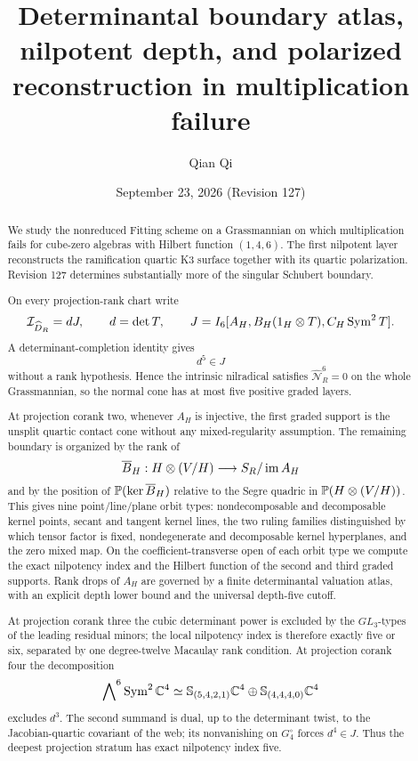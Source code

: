 \title[Determinantal boundary atlas]{Determinantal boundary atlas, nilpotent depth, and polarized reconstruction in multiplication failure}
\author{Qian Qi}
\date{September 23, 2026 \quad (Revision 127)}
\begin{abstract}
We study the nonreduced Fitting scheme on a Grassmannian on which
multiplication fails for cube-zero algebras with Hilbert function
\((1,4,6)\).  The first nilpotent layer reconstructs the ramification
quartic K3 surface together with its quartic polarization.  Revision
127 determines substantially more of the singular Schubert boundary.

On every projection-rank chart write
\[
 \mathcal I_{\widehat D_R}=dJ,\qquad
 d=\det T,\qquad
 J=I_6[A_H,B_H(1_H\otimes T),C_H\operatorname{Sym}^2T].
\]
A determinant-completion identity gives
\[
 d^5\in J
\]
without a rank hypothesis.  Hence the intrinsic nilradical satisfies
\(\widehat{\mathcal N}_R^6=0\) on the whole Grassmannian, so the
normal cone has at most five positive graded layers.

At projection corank two, whenever \(A_H\) is injective, the first
graded support is the unsplit quartic contact cone without any
mixed-regularity assumption.  The remaining boundary is organized by
the rank of
\[
 \overline B_H:H\otimes(V/H)\longrightarrow S_R/\operatorname{im} A_H
\]
and by the position of \(\mathbb P(\ker\overline B_H)\) relative to the
Segre quadric in \(\mathbb P(H\otimes(V/H))\).  This gives nine point/line/plane orbit types: nondecomposable and
decomposable kernel points, secant and tangent kernel lines, the two
ruling families distinguished by which tensor factor is fixed,
nondegenerate and decomposable kernel hyperplanes, and the zero mixed
map.  On the
coefficient-transverse open of each orbit type we compute the exact
nilpotency index and the Hilbert function of the second and third
graded supports.  Rank drops of \(A_H\) are governed by a finite
determinantal valuation atlas, with an explicit depth lower bound and
the universal depth-five cutoff.

At projection corank three the cubic determinant power is excluded by
the \(GL_3\)-types of the leading residual minors; the local
nilpotency index is therefore exactly five or six, separated by one
degree-twelve Macaulay rank condition.  At projection corank four the
decomposition
\[
 \bigwedge\nolimits^6\operatorname{Sym}^2\mathbb C^4
 \simeq
 \mathbb S_{(5,4,2,1)}\mathbb C^4
 \oplus
 \mathbb S_{(4,4,4,0)}\mathbb C^4
\]
excludes \(d^3\).  The second summand is dual, up to the determinant
twist, to the Jacobian-quartic covariant of the web; its nonvanishing
on \(G_4^\circ\) forces \(d^4\in J\).  Thus the deepest projection
stratum has exact nilpotency index five.


\end{abstract}
